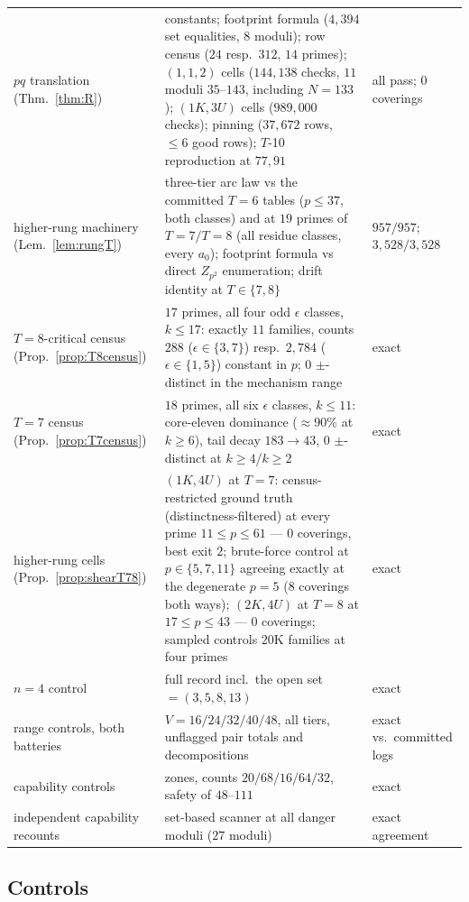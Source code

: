 \documentclass[11pt,a4paper]{article}
\numberwithin{equation}{section}
\theoremstyle{plain}
\theoremstyle{definition}
\theoremstyle{remark}
\begin{document}
\begin{longtable}{@{}p{3.7cm}>{\raggedright\arraybackslash}p{8.2cm}>{\raggedright\arraybackslash}p{3.1cm}@{}}
$pq$ translation (Thm.~\ref{thm:R}) & constants; footprint formula
  ($4{,}394$ set equalities, $8$ moduli); row census ($24$ resp.\ $312$,
  $14$ primes); $(1,1,2)$ cells ($144{,}138$ checks, $11$ moduli $35$--$143$,
  including $N=133$);
  $(1K,3U)$ cells ($989{,}000$ checks); pinning ($37{,}672$ rows,
  $\le6$ good rows); $T$-10 reproduction at $77,91$ &
  all pass; $0$ coverings \\
higher-rung machinery (Lem.~\ref{lem:rungT}) & three-tier arc law vs the
  committed $T=6$ tables ($p\le37$, both classes) and at $19$ primes of
  $T=7/T=8$ (all residue classes, every $a_0$); footprint formula vs
  direct $Z_{p^2}$ enumeration; drift identity at $T\in\{7,8\}$ &
  $957/957$; $3{,}528/3{,}528$ \\
$T=8$-critical census (Prop.~\ref{prop:T8census}) & $17$ primes, all four
  odd $\epsilon$ classes, $k\le17$: exactly $11$ families, counts
  $288$ ($\epsilon\in\{3,7\}$) resp.\ $2{,}784$ ($\epsilon\in\{1,5\}$)
  constant in $p$; $0$ $\pm$-distinct in the mechanism range & exact \\
$T=7$ census (Prop.~\ref{prop:T7census}) & $18$ primes, all six
  $\epsilon$ classes, $k\le11$: core-eleven dominance ($\approx90\%$ at
  $k\ge6$), tail decay $183\to43$, $0$ $\pm$-distinct at $k\ge4$/$k\ge2$ &
  exact \\
higher-rung cells (Prop.~\ref{prop:shearT78}) & $(1K,4U)$ at $T=7$:
  census-restricted ground truth (distinctness-filtered) at every prime
  $11\le p\le61$ --- $0$ coverings, best exit $2$; brute-force control at
  $p\in\{5,7,11\}$ agreeing exactly at the degenerate $p=5$ ($8$
  coverings both ways); $(2K,4U)$ at $T=8$ at $17\le p\le43$ --- $0$
  coverings; sampled controls $20$K families at four primes & exact \\
\midrule
$n=4$ control & full record incl.\ the open set $=(3,5,8,13)$ &
  exact \\
range controls, both batteries & $V=16/24/32/40/48$, all tiers, unflagged
  pair totals and decompositions & exact vs.\ committed logs \\
capability controls & zones, counts $20/68/16/64/32$, safety of
  $48$--$111$ & exact \\
independent capability recounts & set-based scanner at all danger moduli
  ($27$ moduli) & exact agreement \\
\end{longtable}
\endgroup

\subsection{Controls}
\end{document}
